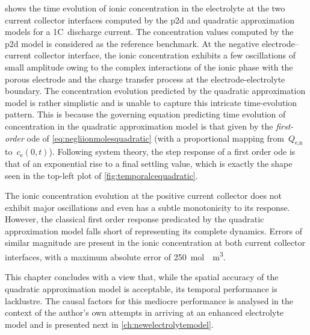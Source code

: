  shows  the time evolution of  ionic concentration
in  the electrolyte  at the  two current  collector interfaces  computed by  the
\gls{p2d} and  quadratic approximation  models for a  1C~discharge  current. The
concentration  values computed  by  the  \gls{p2d} model  is  considered as  the
reference benchmark. At the negative electrode--current collector interface, the
ionic  concentration  exhibits  a  few oscillations  of  small  amplitude  owing
to  the complex  interactions  of  the ionic  phase  with  the porous  electrode
and  the charge  transfer process  at the  electrode-electrolyte boundary.  The
concentration  evolution  predicted  by  the quadratic  approximation  model  is
rather  simplistic  and  is  unable to  capture  this  intricate  time-evolution
pattern.  This  is because  the  governing  equation predicting  time  evolution
of  concentration  in  the  quadratic  approximation  model  is  that  given  by
the  \emph{first-order}  \gls{ode} of \cref{eq:negliionmolesquadratic}  (with  a
proportional mapping from~$Q_\text{e,n}$ to~$c_\text{e}(0,t)$). Following system
theory, the step response  of a first order \gls{ode} is  that of an exponential
rise to a final settling value, which  is exactly the shape seen in the top-left
plot of \cref{fig:temporalcequadratic}.

The ionic  concentration evolution  at the positive  current collector  does not
exhibit major oscillations  and even has a subtle monotonicity  to its response.
However,  the  classical  first  order  response  predicated  by  the  quadratic
approximation model falls short of representing its complete dynamics. Errors of
similar  magnitude  are present  in  the  ionic  concentration at  both  current
collector  interfaces, with  a maximum  absolute error  of \approx\SI{250}{\mole
\per \meter  \cubed}.

This  chapter concludes  with a  view that,  while the  spatial accuracy  of the
quadratic  approximation  model  is  acceptable,  its  temporal  performance  is
lacklustre. The causal factors for this  mediocre performance is analysed in the
context of  the author's  own attempts  in arriving  at an  enhanced electrolyte
model and is presented next in \cref{ch:newelectrolytemodel}.


